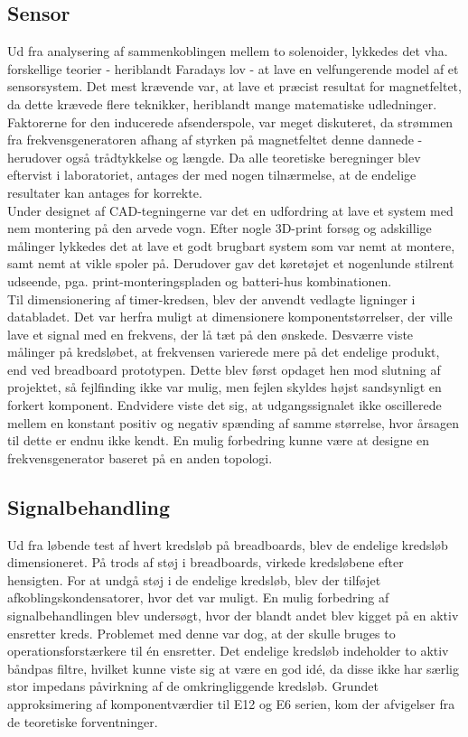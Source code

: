 \subsection{Sensor}
Ud fra analysering af sammenkoblingen mellem to solenoider, lykkedes det vha. forskellige teorier - heriblandt Faradays lov - at lave en velfungerende model af et sensorsystem. 
Det mest krævende var, at lave et præcist resultat for magnetfeltet, da dette krævede flere teknikker, heriblandt mange matematiske udledninger.
Faktorerne for den inducerede afsenderspole, var meget diskuteret, da strømmen fra frekvensgeneratoren afhang af styrken på magnetfeltet denne dannede - herudover også trådtykkelse og længde. 
Da alle teoretiske beregninger blev eftervist i laboratoriet, antages der med nogen tilnærmelse, at de endelige resultater kan antages for korrekte.\\
Under designet af CAD-tegningerne var det en udfordring at lave et system med nem montering på den arvede vogn. Efter nogle 3D-print forsøg og adskillige målinger lykkedes det at lave et godt brugbart system som var nemt at montere, samt nemt at vikle spoler på. Derudover gav det køretøjet et nogenlunde stilrent udseende, pga. print-monteringspladen og batteri-hus kombinationen.\\
Til dimensionering af timer-kredsen, blev der anvendt vedlagte ligninger i databladet.
Det var herfra muligt at dimensionere komponentstørrelser, der ville lave et signal med en frekvens, der lå tæt på den ønskede.
Desværre viste målinger på kredsløbet, at frekvensen varierede mere på det endelige produkt, end ved breadboard prototypen.
Dette blev først opdaget hen mod slutning af projektet, så fejlfinding ikke var mulig, men fejlen skyldes højst sandsynligt en forkert komponent.
Endvidere viste det sig, at udgangssignalet ikke oscillerede mellem en konstant positiv og negativ spænding af samme størrelse, hvor årsagen til dette er endnu ikke kendt.
En mulig forbedring kunne være at designe en frekvensgenerator baseret på en anden topologi.

\subsection{Signalbehandling}
Ud fra løbende test af hvert kredsløb på breadboards, blev de endelige kredsløb dimensioneret.
På trods af støj i breadboards, virkede kredsløbene efter hensigten.
For at undgå støj i de endelige kredsløb, blev der tilføjet afkoblingskondensatorer, hvor det var muligt.
En mulig forbedring af signalbehandlingen blev undersøgt, hvor der blandt andet blev kigget på en aktiv ensretter kreds. Problemet med denne var dog, at der skulle bruges to operationsforstærkere til én ensretter.
Det endelige kredsløb indeholder to aktiv båndpas filtre, hvilket kunne viste sig at være en god idé, da disse ikke har særlig stor impedans påvirkning af de omkringliggende kredsløb.
Grundet approksimering af komponentværdier til E12 og E6 serien, kom der afvigelser fra de teoretiske forventninger.

